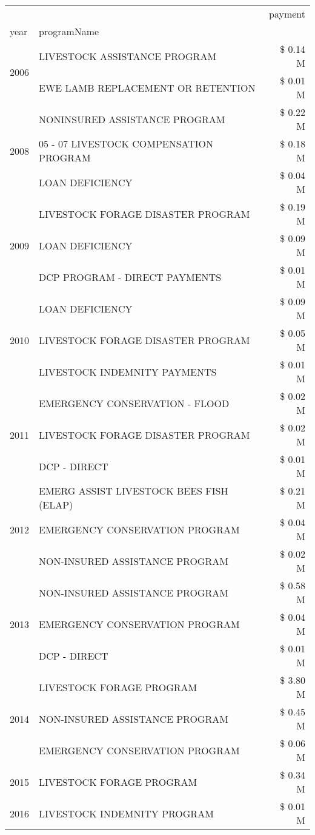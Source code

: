 \begin{tabular}{llr}
\toprule
 &  & payment \\
year & programName &  \\
\midrule
\multirow[t]{2}{*}{2006} & LIVESTOCK ASSISTANCE PROGRAM & \$ 0.14 M \\
 & EWE LAMB REPLACEMENT OR RETENTION & \$ 0.01 M \\
\cline{1-3}
\multirow[t]{3}{*}{2008} & NONINSURED ASSISTANCE PROGRAM & \$ 0.22 M \\
 & 05 - 07 LIVESTOCK COMPENSATION PROGRAM & \$ 0.18 M \\
 & LOAN DEFICIENCY & \$ 0.04 M \\
\cline{1-3}
\multirow[t]{3}{*}{2009} & LIVESTOCK FORAGE DISASTER  PROGRAM & \$ 0.19 M \\
 & LOAN DEFICIENCY & \$ 0.09 M \\
 & DCP PROGRAM - DIRECT PAYMENTS & \$ 0.01 M \\
\cline{1-3}
\multirow[t]{3}{*}{2010} & LOAN DEFICIENCY & \$ 0.09 M \\
 & LIVESTOCK FORAGE DISASTER  PROGRAM & \$ 0.05 M \\
 & LIVESTOCK INDEMNITY PAYMENTS & \$ 0.01 M \\
\cline{1-3}
\multirow[t]{3}{*}{2011} & EMERGENCY CONSERVATION - FLOOD & \$ 0.02 M \\
 & LIVESTOCK FORAGE DISASTER PROGRAM & \$ 0.02 M \\
 & DCP - DIRECT & \$ 0.01 M \\
\cline{1-3}
\multirow[t]{3}{*}{2012} & EMERG ASSIST LIVESTOCK BEES FISH (ELAP) & \$ 0.21 M \\
 & EMERGENCY CONSERVATION PROGRAM & \$ 0.04 M \\
 & NON-INSURED ASSISTANCE PROGRAM & \$ 0.02 M \\
\cline{1-3}
\multirow[t]{3}{*}{2013} & NON-INSURED ASSISTANCE PROGRAM & \$ 0.58 M \\
 & EMERGENCY CONSERVATION PROGRAM & \$ 0.04 M \\
 & DCP - DIRECT & \$ 0.01 M \\
\cline{1-3}
\multirow[t]{3}{*}{2014} & LIVESTOCK FORAGE PROGRAM & \$ 3.80 M \\
 & NON-INSURED ASSISTANCE PROGRAM & \$ 0.45 M \\
 & EMERGENCY CONSERVATION PROGRAM & \$ 0.06 M \\
\cline{1-3}
2015 & LIVESTOCK FORAGE PROGRAM & \$ 0.34 M \\
\cline{1-3}
\multirow[t]{2}{*}{2016} & LIVESTOCK INDEMNITY PROGRAM & \$ 0.01 M \\

\end{tabular}
